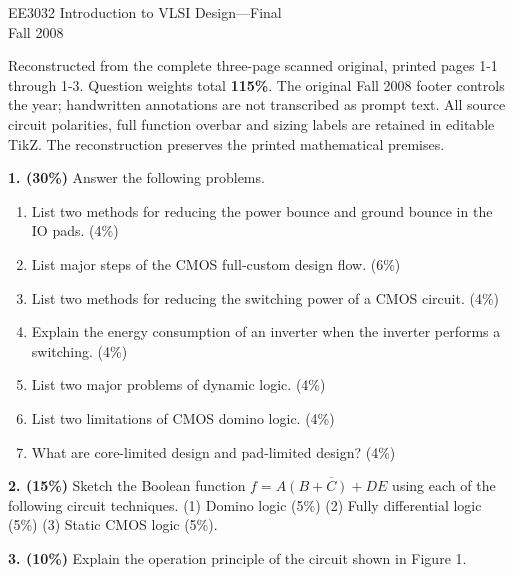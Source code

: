 \documentclass[10pt]{article}
\newcommand{\mos}[4]{\begin{scope}[shift={(#1,#2)}]
\draw(0,.24)--(0,-.24);\draw(0,.2)--(.25,.2)--(.25,.5);\draw(0,-.2)--(.25,-.2)--(.25,-.5);
\draw(-.16,.23)--(-.16,-.23);
\ifnum#4=1\draw(-.26,0)circle(.06);\draw(-.75,0)--(-.32,0);\else\draw(-.75,0)--(-.16,0);\fi
\node[anchor=east,font=\scriptsize]at(-.76,0){$#3$};\end{scope}}
\newcommand{\gnd}[2]{\draw(#1,#2)--(#1,{#2-.12});\draw({#1-.17},{#2-.12})--({#1+.17},{#2-.12});\draw({#1-.11},{#2-.2})--({#1+.11},{#2-.2});}
\newcommand{\rail}[3]{\draw(#1,#2)--(#1,{#2+.14});\node[above,font=\scriptsize]at(#1,{#2+.14}){$#3$};}
\begin{document}
\begin{center}{\Large EE3032 Introduction to VLSI Design---Final}\\Fall 2008\end{center}
Reconstructed from the complete three-page scanned original, printed pages 1-1 through 1-3. Question weights total \textbf{115\%}. The original Fall 2008 footer controls the year; handwritten annotations are not transcribed as prompt text. All source circuit polarities, full function overbar and sizing labels are retained in editable TikZ. The reconstruction preserves the printed mathematical premises.\par\medskip
\textbf{1. (30\%)} Answer the following problems.
\begin{enumerate}[label=(\alph*)]
\item List two methods for reducing the power bounce and ground bounce in the IO pads. (4\%)
\item List major steps of the CMOS full-custom design flow. (6\%)
\item List two methods for reducing the switching power of a CMOS circuit. (4\%)
\item Explain the energy consumption of an inverter when the inverter performs a switching. (4\%)
\item List two major problems of dynamic logic. (4\%)
\item List two limitations of CMOS domino logic. (4\%)
\item What are core-limited design and pad-limited design? (4\%)
\end{enumerate}\textbf{2. (15\%)} Sketch the Boolean function $f=\overline{A(B+C)+DE}$ using each of the following circuit techniques. (1) Domino logic (5\%) (2) Fully differential logic (5\%) (3) Static CMOS logic (5\%).\par\medskip\textbf{3. (10\%)} Explain the operation principle of the circuit shown in Figure 1.\begin{center}
\end{center}
\end{document}

